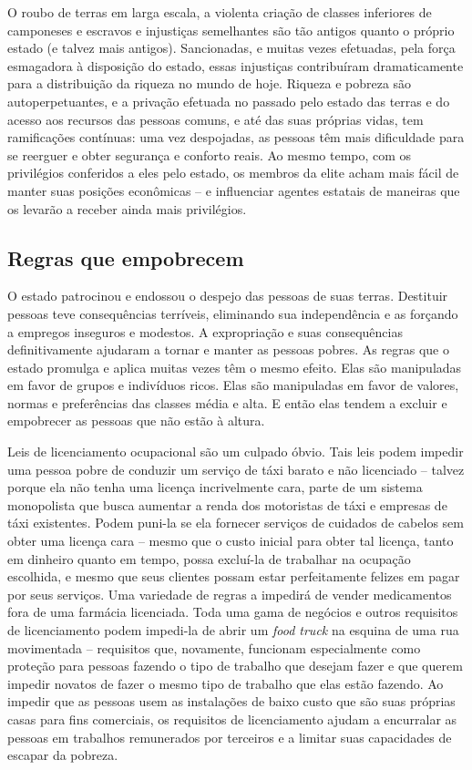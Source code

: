 O roubo de terras em larga escala, a violenta criação de classes inferiores de camponeses e escravos e injustiças semelhantes são tão antigos quanto o próprio estado (e talvez mais antigos). Sancionadas, e muitas vezes efetuadas, pela força esmagadora à disposição do estado, essas injustiças contribuíram dramaticamente para a distribuição da riqueza no mundo de hoje. Riqueza e pobreza são autoperpetuantes, e a privação efetuada no passado pelo estado das terras e do acesso aos recursos das pessoas comuns, e até das suas próprias vidas, tem ramificações contínuas: uma vez despojadas, as pessoas têm mais dificuldade para se reerguer e obter segurança e conforto reais. Ao mesmo tempo, com os privilégios conferidos a eles pelo estado, os membros da elite acham mais fácil de manter suas posições econômicas -- e influenciar agentes estatais de maneiras que os levarão a receber ainda mais privilégios.

\subsection*{Regras que empobrecem}

O estado patrocinou e endossou o despejo das pessoas de suas terras. Destituir pessoas teve consequências terríveis, eliminando sua independência e as forçando a empregos inseguros e modestos. A expropriação e suas consequências definitivamente ajudaram a tornar e manter as pessoas pobres. As regras que o estado promulga e aplica muitas vezes têm o mesmo efeito. Elas são manipuladas em favor de grupos e indivíduos ricos. Elas são manipuladas em favor de valores, normas e preferências das classes média e alta. E então elas tendem a excluir e empobrecer as pessoas que não estão à altura.

Leis de licenciamento ocupacional são um culpado óbvio. Tais leis podem impedir uma pessoa pobre de conduzir um serviço de táxi barato e não licenciado -- talvez porque ela não tenha uma licença incrivelmente cara, parte de um sistema monopolista que busca aumentar a renda dos motoristas de táxi e empresas de táxi existentes. Podem puni-la se ela fornecer serviços de cuidados de cabelos sem obter uma licença cara -- mesmo que o custo inicial para obter tal licença, tanto em dinheiro quanto em tempo, possa excluí-la de trabalhar na ocupação escolhida, e mesmo que seus clientes possam estar perfeitamente felizes em pagar por seus serviços. Uma variedade de regras a impedirá de vender medicamentos fora de uma farmácia licenciada. Toda uma gama de negócios e outros requisitos de licenciamento podem impedi-la de abrir um \emph{food truck} na esquina de uma rua movimentada -- requisitos que, novamente, funcionam especialmente como proteção para pessoas fazendo o tipo de trabalho que desejam fazer e que querem impedir novatos de fazer o mesmo tipo de trabalho que elas estão fazendo. Ao impedir que as pessoas usem as instalações de baixo custo que são suas próprias casas para fins comerciais, os requisitos de licenciamento ajudam a encurralar as pessoas em trabalhos remunerados por terceiros e a limitar suas capacidades de escapar da pobreza.

